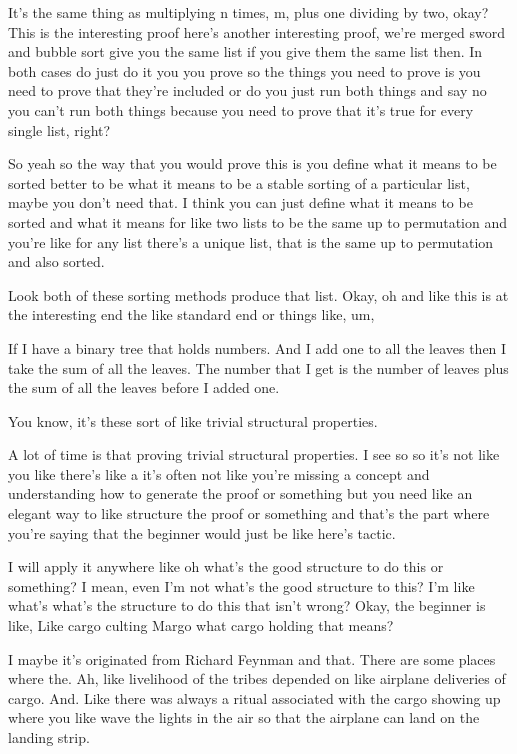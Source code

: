 It's the same thing as multiplying n times, m, plus one dividing by two, okay? This is the interesting proof here's another interesting proof, we're merged sword and bubble sort give you the same list if you give them the same list then. In both cases do just do it you you prove so the things you need to prove is you need to prove that they're included or do you just run both things and say no you can't run both things because you need to prove that it's true for every single list, right? 

So yeah so the way that you would prove this is you define what it means to be sorted better to be what it means to be a stable sorting of a particular list, maybe you don't need that. I think you can just define what it means to be sorted and what it means for like two lists to be the same up to permutation and you're like for any list there's a unique list, that is the same up to permutation and also sorted. 

Look both of these sorting methods produce that list. Okay, oh and like this is at the interesting end the like standard end or things like, um, 

If I have a binary tree that holds numbers. And I add one to all the leaves then I take the sum of all the leaves. The number that I get is the number of leaves plus the sum of all the leaves before I added one. 

You know, it's these sort of like trivial structural properties. 

A lot of time is that proving trivial structural properties. I see so so it's not like you like there's like a it's often not like you're missing a concept and understanding how to generate the proof or something but you need like an elegant way to like structure the proof or something and that's the part where you're saying that the beginner would just be like here's tactic. 

I will apply it anywhere like oh what's the good structure to do this or something? I mean, even I'm not what's the good structure to this? I'm like what's what's the structure to do this that isn't wrong? Okay, the beginner is like, Like cargo culting Margo what cargo holding that means? 

I maybe it's originated from Richard Feynman and that. There are some places where the. Ah, like livelihood of the tribes depended on like airplane deliveries of cargo. And. Like there was always a ritual associated with the cargo showing up where you like wave the lights in the air so that the airplane can land on the landing strip. 

